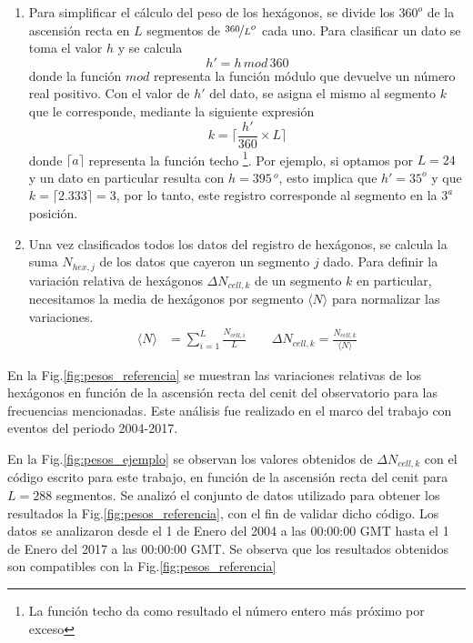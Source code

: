 \begin{enumerate}
        \item  Para simplificar el cálculo del peso de los hexágonos, se divide los $360^o$ de la ascensión recta en $L$ segmentos de $\nicefrac{360}{L} ^o$ cada uno. Para clasificar un dato se  toma  el valor $h$  y se calcula
        \begin{equation}
          h' = h\, mod \,360 %
          \label{eq:h_primado}
        \end{equation}
        donde la función $mod$ representa la función módulo que devuelve un número real positivo. Con el valor de $h'$ del dato, se asigna el mismo al segmento $k$ que le corresponde, mediante la siguiente expresión
        \begin{equation}
          k = \bigg \lceil \frac{h'}{360}\times L \bigg \rceil
        \end{equation}
        donde $\lceil a \rceil$ representa la función techo \footnote{La función techo da como resultado el número entero más próximo por exceso}. Por ejemplo, si optamos por $L=24$ y un dato en particular resulta con  $h=395\,^o$, esto implica que $h'= 35^o$ y que $k=\lceil 2.333 \rceil=3$, por lo tanto, este registro corresponde al segmento en la $3^{a}$ posición.

        \item Una vez clasificados todos los datos del registro de hexágonos, se calcula la suma  $N_{hex, j}$ de los datos que cayeron un segmento $j$ dado. Para definir la variación relativa de hexágonos  $\Delta N_{cell,k}$ de un segmento $k$ en particular, necesitamos la media de hexágonos por segmento $ \langle N \rangle$  para normalizar las variaciones.
       \begin{align}
         \langle N \rangle &= \sum^{L}_{i=1} \frac{N_{cell, i}}{L}  \qquad
         \Delta N_{cell,k} = \frac{N_{cell, k}}{\langle N \rangle}  \label{epepe}
       \end{align}
      \end{enumerate}
 
      En la Fig.\ref{fig:pesos_referencia} se muestran las variaciones relativas de los hexágonos en función de la ascensión recta del cenit del observatorio para las frecuencias mencionadas. Este análisis fue realizado en el marco del trabajo \cite{referencia_pesos} con eventos del periodo 2004-2017. 


      En la Fig.\ref{fig:pesos_ejemplo} se observan los valores obtenidos de $\Delta N_{cell,k}$  con el código escrito para este trabajo, en función de la ascensión recta del cenit  para $L=288$ segmentos. Se analizó el conjunto de datos  utilizado para obtener los resultados la Fig.\ref{fig:pesos_referencia}, con el fin de validar dicho código. Los datos se analizaron desde el 1 de Enero del 2004 a las 00:00:00 GMT  hasta el 1 de Enero del 2017 a las 00:00:00 GMT. Se  observa que los resultados obtenidos son compatibles con la Fig.\ref{fig:pesos_referencia}
      

